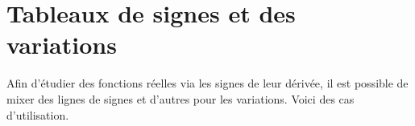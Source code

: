\documentclass[10pt, a4paper]{tutodoc}
\begin{document}
\section{Tableaux de signes et des variations}

Afin d'étudier des fonctions réelles via les signes de leur dérivée, il est possible de mixer des lignes de signes et d'autres pour les variations. Voici des cas d'utilisation.
 
\end{document}
